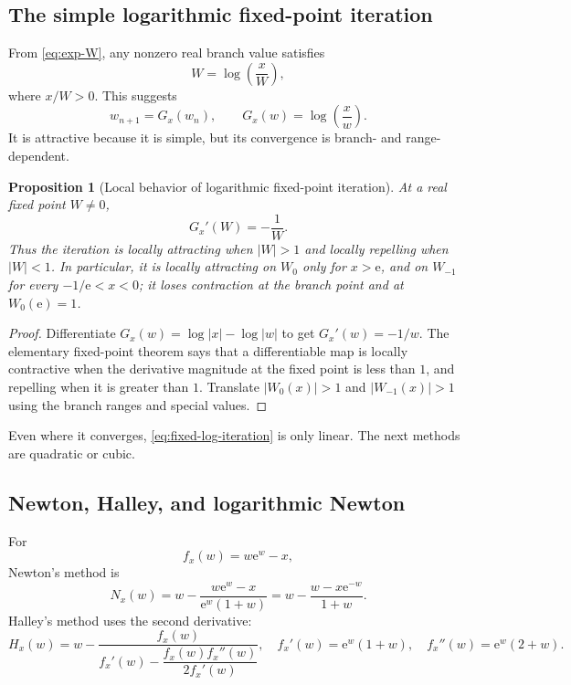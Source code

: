 \documentclass[11pt]{article}
\numberwithin{equation}{section}
\newtheorem{proposition}[theorem]{Proposition}
\theoremstyle{definition}
\theoremstyle{remark}
\newcommand{\e}{\mathrm e}
\begin{document}
\subsection{The simple logarithmic fixed-point iteration}

From \eqref{eq:exp-W}, any nonzero real branch value satisfies
\begin{equation}
  W=\log\left(\frac{x}{W}\right),                     \label{eq:fixed-log}
\end{equation}
where $x/W>0$.  This suggests
\begin{equation}
  w_{n+1}=G_x(w_n),
  \qquad
  G_x(w)=\log\left(\frac{x}{w}\right).                \label{eq:fixed-log-iteration}
\end{equation}
It is attractive because it is simple, but its convergence is branch- and
range-dependent.

\begin{proposition}[Local behavior of logarithmic fixed-point iteration]
\label{prop:fixed-point-convergence}
At a real fixed point $W\ne0$,
\begin{equation}
  G_x'(W)=-\frac1W.                                    \label{eq:fixed-point-derivative}
\end{equation}
Thus the iteration is locally attracting when $|W|>1$ and locally repelling
when $|W|<1$.  In particular, it is locally attracting on $W_0$ only for
$x>\e$, and on $W_{-1}$ for every $-1/\e<x<0$; it loses contraction at the
branch point and at $W_0(\e)=1$.
\end{proposition}

\begin{proof}
Differentiate $G_x(w)=\log|x|-\log|w|$ to get $G_x'(w)=-1/w$.  The elementary
fixed-point theorem says that a differentiable map is locally contractive
when the derivative magnitude at the fixed point is less than $1$, and
repelling when it is greater than $1$.  Translate $|W_0(x)|>1$ and
$|W_{-1}(x)|>1$ using the branch ranges and special values.
\end{proof}

Even where it converges, \eqref{eq:fixed-log-iteration} is only linear.  The
next methods are quadratic or cubic.

\subsection{Newton, Halley, and logarithmic Newton}

For
\[
  f_x(w)=w\e^w-x,
\]
Newton's method is
\begin{equation}
 N_x(w)=w-\frac{w\e^w-x}{\e^w(1+w)}
       =w-\frac{w-x\e^{-w}}{1+w}.                     \label{eq:newton-original}
\end{equation}
Halley's method uses the second derivative:
\begin{equation}
 H_x(w)=w-
 \frac{f_x(w)}{f_x'(w)-\dfrac{f_x(w)f_x''(w)}{2f_x'(w)}},
 \quad
 f_x'(w)=\e^w(1+w),\quad f_x''(w)=\e^w(2+w).           \label{eq:halley}
\end{equation}
\end{document}
